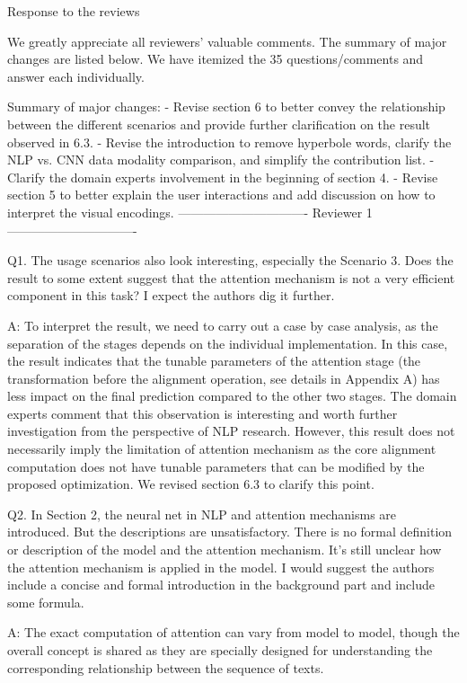 Response to the reviews

We greatly appreciate all reviewers' valuable comments. The summary of major changes are listed below. We have itemized the 35 questions/comments and answer each individually.

Summary of major changes:
- Revise section 6 to better convey the relationship between the different scenarios and provide further clarification on the result observed in 6.3.
- Revise the introduction to remove hyperbole words, clarify the NLP vs. CNN data modality comparison, and simplify the contribution list.
- Clarify the domain experts involvement in the beginning of section 4.
- Revise section 5 to better explain the user interactions and add discussion on how to interpret the visual encodings.
------------------------------- Reviewer 1 -------------------------------


Q1. The usage scenarios also look interesting, especially the Scenario 3. Does the result to some extent suggest that the attention mechanism is not a very efficient component in this task? I expect the authors dig it further.

A: To interpret the result, we need to carry out a case by case analysis, as the separation of the stages depends on the individual implementation. In this case, the result indicates that the tunable parameters of the attention stage (the transformation before the alignment operation, see details in Appendix A) has less impact on the final prediction compared to the other two stages. The domain experts comment that this observation is interesting and worth further investigation from the perspective of NLP research. However, this result does not necessarily imply the limitation of attention mechanism as the core alignment computation does not have tunable parameters that can be modified by the proposed optimization. We revised section 6.3 to clarify this point.


Q2. In Section 2, the neural net in NLP and attention mechanisms are introduced. But the descriptions are unsatisfactory. There is no formal definition or description of the model and the attention mechanism. It's still unclear how the attention mechanism is applied in the model. I would suggest the authors include a concise and formal introduction in the background part and include some formula.

A: The exact computation of attention can vary from model to model, though the overall concept is shared as they are specially designed for understanding the corresponding relationship between the sequence of texts.

